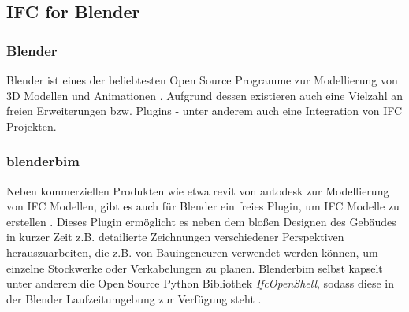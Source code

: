 \subsection{IFC for Blender}
\subsubsection{Blender}
Blender ist eines der beliebtesten Open Source Programme zur Modellierung von 3D Modellen und Animationen \cite{blendero56:online}.
Aufgrund dessen existieren auch eine Vielzahl an freien Erweiterungen bzw. Plugins - unter anderem auch eine Integration von IFC Projekten.

\subsubsection{blenderbim}
Neben kommerziellen Produkten wie etwa revit von autodesk \cite{RevitSof26:online} zur Modellierung von IFC Modellen, gibt es auch für Blender ein freies Plugin, um IFC Modelle zu erstellen \cite{BlenderB43:online}.
Dieses Plugin ermöglicht es neben dem bloßen Designen des Gebäudes in kurzer Zeit z.B. detailierte Zeichnungen verschiedener Perspektiven herauszuarbeiten, die z.B. von Bauingeneuren verwendet werden können, um einzelne Stockwerke oder Verkabelungen zu planen.
Blenderbim selbst kapselt unter anderem die Open Source Python Bibliothek \textit{IfcOpenShell}, sodass diese in der Blender Laufzeitumgebung zur Verfügung steht \cite{IFCOpenShell:online}.

